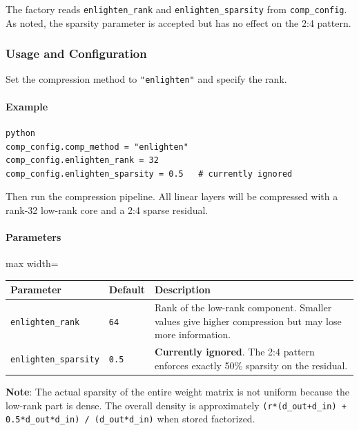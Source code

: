 The factory reads \texttt{enlighten\_rank} and \texttt{enlighten\_sparsity} from \texttt{comp\_config}. As noted, the sparsity parameter is accepted but has no effect on the 2:4 pattern.


\subsubsection*{Usage and Configuration}

Set the compression method to \texttt{"enlighten"} and specify the rank.

\paragraph{Example}

\vspace{0.5em}
\begin{mdframed}[backgroundcolor=codebg, linecolor=codeframe, linewidth=1pt, roundcorner=4pt, innerleftmargin=2pt, innerrightmargin=5pt, innertopmargin=5pt, innerbottommargin=5pt]
\begin{lstlisting}
python
comp_config.comp_method = "enlighten"
comp_config.enlighten_rank = 32
comp_config.enlighten_sparsity = 0.5   # currently ignored
\end{lstlisting}
\end{mdframed}
\vspace{0.5em}

Then run the compression pipeline. All linear layers will be compressed with a rank-32 low-rank core and a 2:4 sparse residual.

\paragraph{Parameters}

\begin{center}
\begin{adjustbox}{max width=\columnwidth}
\renewcommand{\arraystretch}{1.2}
\begin{tabular}{lll}
\toprule
Parameter & Default & Description \\
\midrule
\texttt{enlighten\_rank} & \texttt{64} & Rank of the low-rank component. Smaller values give higher compression but may lose more information. \\
\texttt{enlighten\_sparsity} & \texttt{0.5} & \textbf{Currently ignored}. The 2:4 pattern enforces exactly 50\% sparsity on the residual. \\

\bottomrule
\end{tabular}
\end{adjustbox}
\end{center}
\textbf{Note}: The actual sparsity of the entire weight matrix is not uniform because the low-rank part is dense. The overall density is approximately \texttt{(r*(d\_out+d\_in) + 0.5*d\_out*d\_in) / (d\_out*d\_in)} when stored factorized.


